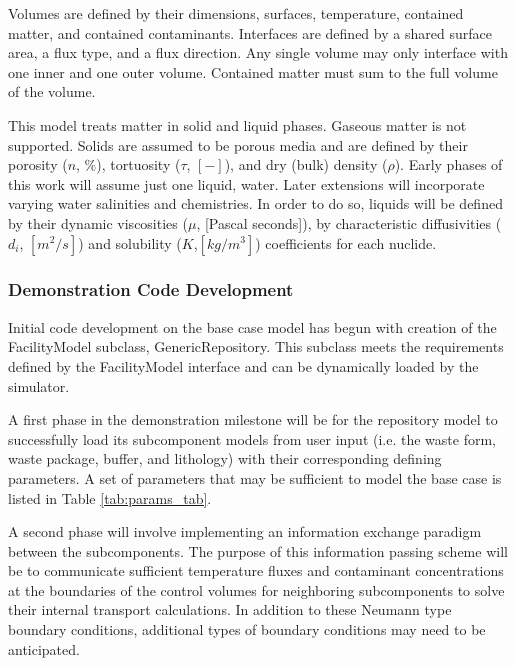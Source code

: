 


Volumes are defined by their dimensions, surfaces, temperature, contained
matter, and contained contaminants.  Interfaces are defined by a shared 
surface area, a flux type, and a flux direction. Any single volume may only 
interface with one inner and one outer volume. Contained matter must sum 
to the full volume of the volume.

This model treats matter in solid and liquid phases. Gaseous matter is not 
supported. 
Solids are assumed to be porous media and are defined by their porosity 
($n$, $\%$), tortuosity ($\tau$, $[-]$), and dry (bulk) density ($\rho$). 
Early phases of this work will assume just one liquid, water. Later 
extensions will incorporate varying water salinities and chemistries. 
In order to do so, liquids will be defined by their dynamic viscosities ($\mu$, 
[Pascal seconds]),
by characteristic diffusivities ($d_i$, $[m^2/s]$) and solubility ($K$,$[kg/m^3]$) 
coefficients for each nuclide.

\subsubsection{Demonstration Code Development}

    
  Initial code development on the base case model has begun with creation of the 
  FacilityModel subclass, GenericRepository. This subclass meets the 
  requirements defined by the \Cyclus FacilityModel interface and can be 
  dynamically loaded by the simulator. 

  A first phase in the demonstration milestone will be for the repository model 
  to successfully load its subcomponent models from user input (i.e. the 
  waste form, waste package, buffer, and lithology) with their corresponding 
  defining parameters. A set of parameters that may be sufficient to model the 
  base case is listed in Table \ref{tab:params_tab}.

  

  A second phase will involve implementing an information exchange paradigm 
  between the subcomponents. The purpose of this information passing scheme will  
  be to communicate sufficient temperature fluxes and contaminant concentrations 
  at the boundaries of the control volumes for neighboring subcomponents to  solve 
  their internal transport calculations.  In addition to these Neumann type 
  boundary conditions, additional types of boundary conditions may need to be 
  anticipated.

